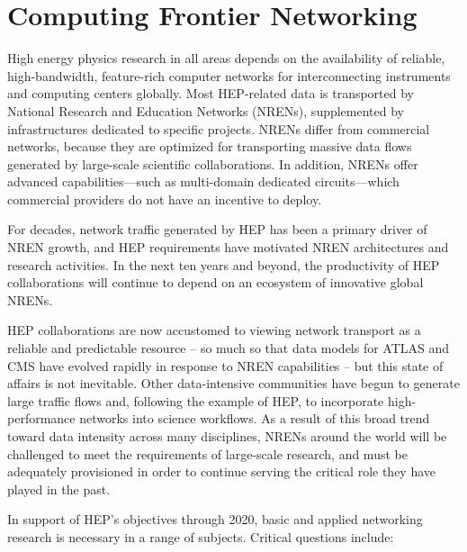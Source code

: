 \section{Computing Frontier Networking}


High energy physics research in all areas depends on the availability of reliable, high-bandwidth, feature-rich computer networks for interconnecting instruments and computing centers globally. Most HEP-related data is transported by National Research and Education Networks (NRENs), supplemented by infrastructures dedicated to specific projects. NRENs differ from commercial networks, because they are optimized for transporting massive data flows generated by large-scale scientific collaborations. In addition, NRENs offer advanced capabilities---such as multi-domain dedicated circuits---which commercial providers do not have an incentive to deploy.

For decades, network traffic generated by HEP has been a primary driver of NREN growth, and HEP requirements have motivated NREN architectures and research activities. In the next ten years and beyond, the productivity of HEP collaborations will continue to depend on an ecosystem of innovative global NRENs. 

HEP collaborations are now accustomed to viewing network transport as a reliable and predictable resource – so much so that data models for ATLAS and CMS have evolved rapidly in response to NREN capabilities – but this state of affairs is not inevitable. Other data-intensive communities have begun to generate large traffic flows and, following the example of HEP, to incorporate high-performance networks into science workflows. As a result of this broad trend toward data intensity across many disciplines, NRENs around the world will be challenged to meet the requirements of large-scale research, and must be adequately provisioned in order to continue serving the critical role they have played in the past.  

In support of HEP’s objectives through 2020, basic and applied networking research is necessary in a range of subjects. Critical questions include: 

